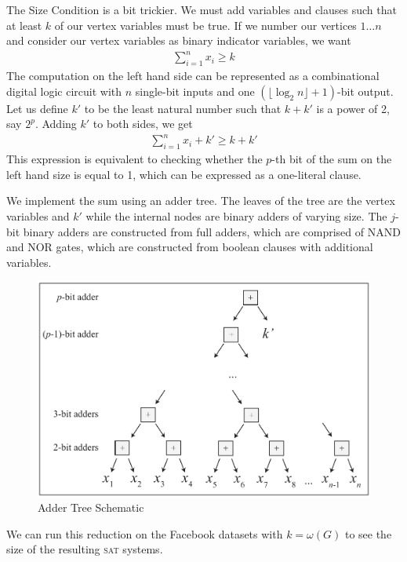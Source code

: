 \documentclass[]{article}
\newcommand{\sat}{\textsc{sat}}
\begin{document}
	The Size Condition is a bit trickier. We must add variables and clauses such that at least $k$ of our vertex variables must be true. If we number our vertices $1 \ldots n$ and consider our vertex variables as binary indicator variables, we want
	\begin{align}
	\sum_{i = 1}^{n} x_i \ge k
	\end{align}
	The computation on the left hand side can be represented as a combinational digital logic circuit with $n$ single-bit inputs and one $(\lfloor\log_2 n\rfloor + 1)$-bit output. Let us define $k'$ to be the least natural number such that $k + k'$ is a power of 2, say $2^p$. Adding $k'$ to both sides, we get 
	\begin{align}
	\sum_{i = 1}^{n} x_i + k' \ge k + k'
	\end{align}
	This expression is equivalent to checking whether the $p$-th bit of the sum on the left hand size is equal to 1, which can be expressed as a one-literal clause.
	
	We implement the sum using an adder tree. The leaves of the tree are the vertex variables and $k'$ while the internal nodes are binary adders of varying size. The $j$-bit binary adders are constructed from full adders, which are comprised of NAND and NOR gates, which are constructed from boolean clauses with additional variables.
	
		\begin{figure}[H]
			\caption{Adder Tree Schematic}
			\includegraphics[width=4.5 in]{adder-tree}
			\centering
		\end{figure}

	We can run this reduction on the Facebook datasets with $k = \omega(G)$ to see the size of the resulting \sat{} systems.
\end{document}
